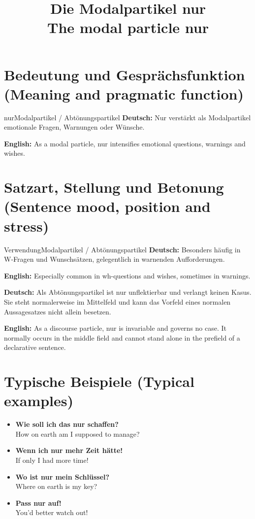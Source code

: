 \documentclass[a4paper,11pt]{article}
\title{Die Modalpartikel \glqq nur\grqq\\{\large\textnormal{The modal particle nur}}}
\date{}
\newcommand{\GermanText}[1]{\textbf{Deutsch: }#1\par}
\newcommand{\EnglishText}[1]{{\small\color{SoftGray}\textbf{English: }#1\par}}
\newcommand{\ExampleItem}[2]{\item \textbf{#1}\\{\small\color{SoftGray}#2}}
\begin{document}
\maketitle
\tableofcontents
\section{Bedeutung und Gesprächsfunktion \textnormal{(Meaning and pragmatic function)}}
\begin{grammarentry}{nur}{Modalpartikel / Abtönungspartikel}
\GermanText{Nur verstärkt als Modalpartikel emotionale Fragen, Warnungen oder Wünsche.}
\EnglishText{As a modal particle, nur intensifies emotional questions, warnings and wishes.}
\end{grammarentry}
\section{Satzart, Stellung und Betonung \textnormal{(Sentence mood, position and stress)}}
\begin{grammarentry}{Verwendung}{Modalpartikel / Abtönungspartikel}
\GermanText{Besonders häufig in W-Fragen und Wunschsätzen, gelegentlich in warnenden Aufforderungen.}
\EnglishText{Especially common in wh-questions and wishes, sometimes in warnings.}
\end{grammarentry}
\GermanText{Als Abtönungspartikel ist nur unflektierbar und verlangt keinen Kasus. Sie steht normalerweise im Mittelfeld und kann das Vorfeld eines normalen Aussagesatzes nicht allein besetzen.}
\EnglishText{As a discourse particle, nur is invariable and governs no case. It normally occurs in the middle field and cannot stand alone in the prefield of a declarative sentence.}
\section{Typische Beispiele \textnormal{(Typical examples)}}
\begin{exbox}\begin{itemize}
\ExampleItem{Wie soll ich das nur schaffen?}{How on earth am I supposed to manage?}
\ExampleItem{Wenn ich nur mehr Zeit hätte!}{If only I had more time!}
\ExampleItem{Wo ist nur mein Schlüssel?}{Where on earth is my key?}
\ExampleItem{Pass nur auf!}{You'd better watch out!}
\end{itemize}\end{exbox}
\end{document}
